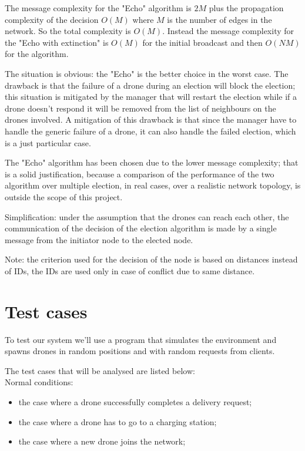 \documentclass[a4paper, oneside]{memoir}
\begin{document}
The message complexity for the "Echo" algorithm is $2M$ plus the propagation complexity of the decision $O(M)$ where $M$ is the number of edges in the network. So the total complexity is $ O(M) $.
Instead the message complexity for the "Echo with extinction" is $O(M)$ for the initial broadcast and then $O(N M)$ for the algorithm.

The situation is obvious: the "Echo" is the better choice in the worst case.
The drawback is that the failure of a drone during an election will block the election; this situation is mitigated by the manager that will restart the election while if a drone doesn't respond it will be removed from the list of neighbours on the drones involved.
A mitigation of this drawback is that since the manager have to handle the generic failure of a drone, it can also handle the failed election, which is a just particular case.

The "Echo" algorithm has been chosen due to the lower message complexity; that is a solid justification, because a comparison of the performance of the two algorithm over multiple election, in real cases, over a realistic network topology, is outside the scope of this project.

Simplification: under the assumption that the drones can reach each other, the communication of the decision of the election algorithm is made by a single message from the initiator node to the elected node.

Note: the criterion used for the decision of the node is based on distances instead of IDs, the IDs are used only in case of conflict due to same distance.


\section{Test cases}

To test our system we'll use a program that simulates the environment and spawns drones in random positions and with random requests from clients.

The test cases that will be analysed are listed below:\\

Normal conditions:
\begin{itemize}
	\item the case where a drone successfully completes a delivery request;
	\item the case where a drone has to go to a charging station;
	\item the case where a new drone joins the network;
\end{itemize}
\end{document}
